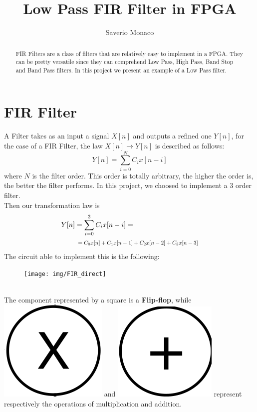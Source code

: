 \documentclass[11pt,a4paper,twocolumn]{IEEEtran}
\author{Saverio Monaco\\ \sepline}
\title{\textbf{Low Pass FIR Filter in FPGA}}
\newcommand*{\Scale}[2][4]{\scalebox{#1}{$#2$}}
\begin{document}
	\maketitle
	\begin{abstract}
		FIR Filters are a class of filters that are relatively easy to implement in a FPGA. They can be pretty versatile since they can comprehend Low Pass, High Pass, Band Stop and Band Pass filters. In this project we present an example of a Low Pass filter.
	\end{abstract}
	\section{FIR Filter}
		A Filter takes as an input a signal $X[n]$ and outputs a refined one $Y[n]$, for the case of a FIR Filter, the law $X[n]\to Y[n]$ is described as follows: 
		$$ Y[n] = \sum_{i=0}^N C_i x[n-i] $$
		where $N$ is the filter order. This order is totally arbitrary, the higher the order is, the better the filter performs. In this project, we choosed to implement a 3 order filter.\\ Then our transformation law is
		$$\begin{aligned} Y[n]&=\sum_{i=0}^3 C_ix[n-i]=\\ & \Scale[0.8]{\hspace*{.2cm}=C_0x[n]+C_1x[n-1]+C_2x[n-2]+C_3x[n-3]}\end{aligned}$$
		The circuit able to implement this is the following:
		\begin{figure}[h]
			\centering
			\texttt{[image: img/FIR\_direct]}
		\end{figure}\\
		The component represented by a square is a \textbf{Flip-flop}, while \includegraphics[width=0.05\linewidth]{img/x} and \includegraphics[width=0.05\linewidth]{img/+} represent respectively the operations of multiplication and addition.
\end{document}
